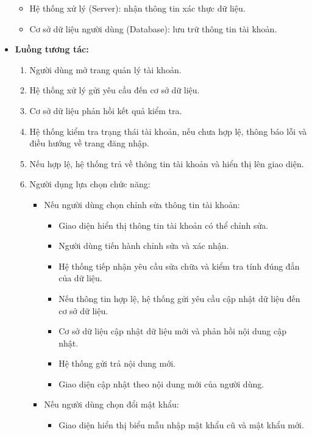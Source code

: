 \documentclass[a4paper]{article}
\begin{document}
\begin{itemize}
\begin{itemize}
		      \item Hệ thống xử lý (Server): nhận thông tin xác thực dữ liệu.
		      \item Cơ sở dữ liệu người dùng (Database): lưu trữ thông tin tài khoản.
	      \end{itemize}
	\item \textbf{Luồng tương tác:}
	      \begin{enumerate}
		      \item Người dùng mở trang quản lý tài khoản.
		      \item Hệ thống xử lý gửi yêu cầu đến cơ sở dữ liệu.
		      \item Cơ sở dữ liệu phản hồi kết quả kiểm tra.
		      \item Hệ thống kiểm tra trạng thái tài khoản, nếu chưa hợp lệ, thông báo lỗi và điều hướng về trang đăng nhập.
		      \item Nếu hợp lệ, hệ thống trả về thông tin tài khoản và hiển thị lên giao diện.
		      \item Người dụng lựa chọn chức năng:
		            \begin{itemize}
			            \item Nếu người dùng chọn chỉnh sửa thông tin tài khoản:
			                  \begin{itemize}
				                  \item Giao diện hiển thị thông tin tài khoản có thể chỉnh sửa.
				                  \item Người dùng tiến hành chỉnh sửa và xác nhận.
				                  \item Hệ thống tiếp nhận yêu cầu sửa chữa và kiểm tra tính đúng đắn của dữ liệu.
				                  \item Nếu thông tin hợp lệ, hệ thống gửi yêu cầu cập nhật dữ liệu đến cơ sở dữ liệu.
				                  \item Cơ sở dữ liệu cập nhật dữ liệu mới và phản hồi nội dung cập nhật.
				                  \item Hệ thống gửi trả nội dung mới.
				                  \item Giao diện cập nhật theo nội dung mới của người dùng.
			                  \end{itemize}
			            \item Nếu người dùng chọn đổi mật khẩu:
			                  \begin{itemize}
				                  \item Giao diện hiển thị biểu mẫu nhập mật khẩu cũ và mật khẩu mới.

\end{itemize}
\end{itemize}
\end{enumerate}
\end{itemize}
\end{document}
